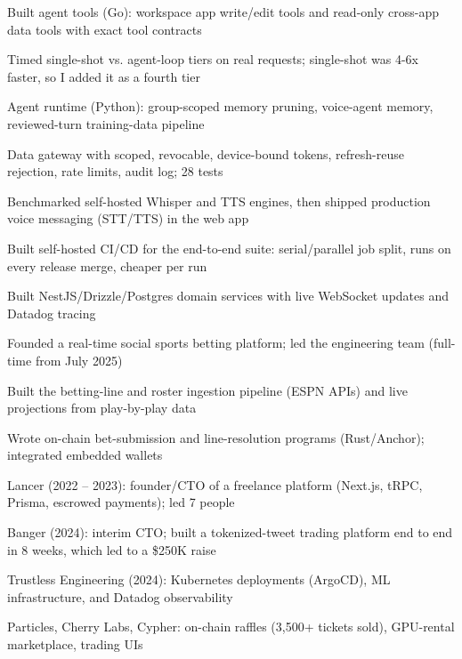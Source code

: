 \documentclass[print]{jack-resume}
\begin{document}
\begin{tightemize}
    \item Built agent tools (Go): workspace app write/edit tools and read-only cross-app data tools with exact tool contracts
    \item Timed single-shot vs. agent-loop tiers on real requests; single-shot was 4-6x faster, so I added it as a fourth tier
    \item Agent runtime (Python): group-scoped memory pruning, voice-agent memory, reviewed-turn training-data pipeline
    \item Data gateway with scoped, revocable, device-bound tokens, refresh-reuse rejection, rate limits, audit log; 28 tests
    \item Benchmarked self-hosted Whisper and TTS engines, then shipped production voice messaging (STT/TTS) in the web app
    \item Built self-hosted CI/CD for the end-to-end suite: serial/parallel job split, runs on every release merge, cheaper per run
\end{tightemize}
\sectionsep

\begin{tightemize}
    \item Built NestJS/Drizzle/Postgres domain services with live WebSocket updates and Datadog tracing
    \item Founded a real-time social sports betting platform; led the engineering team (full-time from July 2025)
    \item Built the betting-line and roster ingestion pipeline (ESPN APIs) and live projections from play-by-play data
    \item Wrote on-chain bet-submission and line-resolution programs (Rust/Anchor); integrated embedded wallets
\end{tightemize}
\sectionsep

\begin{tightemize}
    \item Lancer (2022 – 2023): founder/CTO of a freelance platform (Next.js, tRPC, Prisma, escrowed payments); led 7 people
    \item Banger (2024): interim CTO; built a tokenized-tweet trading platform end to end in 8 weeks, which led to a \$250K raise
    \item Trustless Engineering (2024): Kubernetes deployments (ArgoCD), ML infrastructure, and Datadog observability
    \item Particles, Cherry Labs, Cypher: on-chain raffles (3,500+ tickets sold), GPU-rental marketplace, trading UIs
\end{tightemize}
\sectionsep
\end{document}

